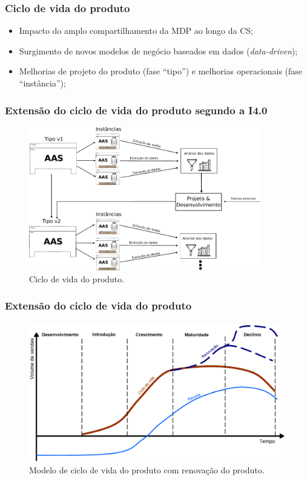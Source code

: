 \documentclass[10pt]{beamer}
\begin{document}
\begin{frame}
	\frametitle{Ciclo de vida do produto}
	
	\begin{itemize}
		\item Impacto do amplo compartilhamento da MDP ao longo da CS;
		\item Surgimento de novos modelos de negócio baseados em dados (\textit{data-driven});
		\item Melhorias de projeto do produto (fase ``tipo'') e melhorias operacionais (fase ``instância'');
	\end{itemize}
	
\end{frame}
\begin{frame}
	\frametitle{Extensão do ciclo de vida do produto segundo a I4.0}
	
	\begin{figure}[htb!]
		\centering
		\caption{Ciclo de vida do produto.}
		\label{fig:aas-lifecycle}
		\includegraphics[width=0.9\textwidth]{aas-lifecycle}
	\end{figure}
	
\end{frame}
\begin{frame}
	\frametitle{Extensão do ciclo de vida do produto} 
	
	\begin{figure}[htb]
		\centering
		\caption{Modelo de ciclo de vida do produto com renovação do produto.}
		\label{fig:ciclo-de-vida-extensao}
		\includegraphics[width=1\textwidth]{ciclo-de-vida-extensao.png}
	\end{figure}
	
\end{frame}
\end{document}
